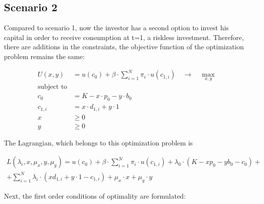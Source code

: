 \subsection{Scenario 2}

\noindent Compared to scenario 1, now the investor has a second option to invest his capital in order to receive consumption at t=1, a riskless investment. Therefore, there are additions in the constraints, the objective function of the optimization problem remains the same:

\begin{equation}\label{eq:opt.prob2}
\begin{split}
    U(x, y) &= u(c_0) + \beta \cdot \sum_{i=1}^{N} \pi_i \cdot u(c_{1,i}) \quad \rightarrow \quad \max_{x, y}\\
    \text{subject to} &\\
    c_0 & = K - x \cdot p_0 - y \cdot b_0 \\
    c_{1,i} & = x \cdot d_{1,i} + y \cdot 1 \\
    x & \geq 0\\
    y & \geq 0
\end{split}   
\end{equation}

\bigskip

\noindent The Lagrangian, which belongs to this optimization problem is

\begin{multline}\label{eq:lagr_riskless}
    L(\lambda_i, x, \mu_x, y, \mu_y) = u(c_0) + \beta \cdot \sum_{i=1}^{N} \pi_i \cdot u(c_{1,i}) + \lambda_0 \cdot (K-x p_0 - y b_0 -c_0) + \\ + \sum_{i=1}^{N} \lambda_i \cdot (x d_{1,i} + y \cdot 1 - c_{1,i}) + \mu_x \cdot x + \mu_y \cdot y
\end{multline}

\bigskip

\noindent Next, the first order conditions of optimality are formulated:

